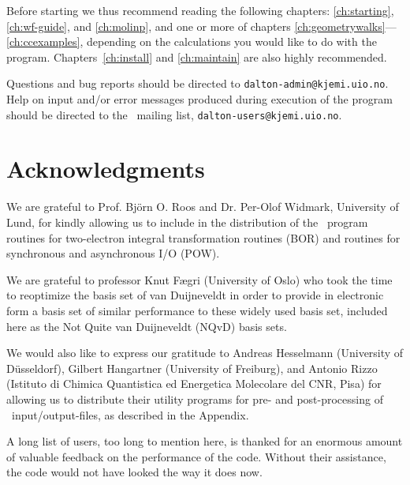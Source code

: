 Before starting we thus recommend reading
the following chapters: \ref{ch:starting}, \ref{ch:wf-guide}, and
\ref{ch:molinp}, and one or more of chapters
\ref{ch:geometrywalks}---\ref{ch:ccexamples}, depending on the
calculations you would like to do with the
program. Chapters~\ref{ch:install} and \ref{ch:maintain} are also
highly recommended.

Questions and bug reports should be
directed to \verb|dalton-admin@kjemi.uio.no|. Help on input and/or
error messages produced during execution of the program should be
directed to the \dalton\ mailing list,
\verb|dalton-users@kjemi.uio.no|.

\section{Acknowledgments}

We are grateful to Prof. Bj\"{o}rn O. Roos and Dr. Per-Olof
Widmark, University of Lund, for kindly allowing us to include in
the distribution of the \dalton\ program routines for 
two-electron integral transformation routines
(BOR) and routines for synchronous and asynchronous I/O (POW). 

We are grateful to professor Knut F\ae gri (University of Oslo) who
took the time to reoptimize the basis set of van Duijneveldt in order
to provide in electronic form a basis set of similar performance to
these widely used basis set, included here as the Not Quite van
Duijneveldt (NQvD) basis sets.

We would also like to express our gratitude to Andreas Hesselmann
(University of D\"{u}sseldorf), Gilbert Hangartner (University of
Freiburg), and Antonio
Rizzo (Istituto di Chimica Quantistica ed Energetica Molecolare del
CNR, Pisa) for allowing us to distribute their utility programs for
pre- and post-processing of \dalton\ input/output-files, as described
in the Appendix.

A long list of users, too long to mention here, is thanked for an
enormous amount of valuable feedback on the performance of the
code. Without their assistance, the code would not have looked the
way it does now.
